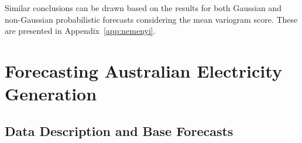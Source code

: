 \documentclass[a4paper,12pt]{article}
\theoremstyle{definition}
\begin{document}
Similar conclusions can be drawn based on the results for both Gaussian and non-Gaussian probabilistic forecasts considering the mean variogram score. These are presented in Appendix~\ref{app:nemenyi}.



\section{Forecasting Australian Electricity Generation}\label{sec:Application}

\subsection{Data Description and Base Forecasts}\label{sec:datadesc}
\end{document}

